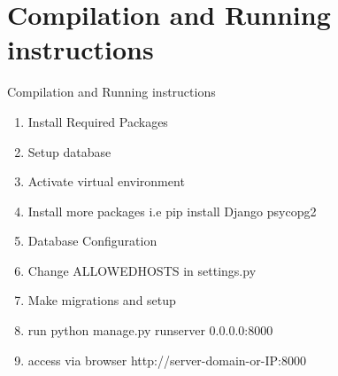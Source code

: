 \documentclass [] {beamer}
\begin{document}


\section{Compilation and Running instructions}
\begin{frame}{Compilation and Running instructions}

\begin{enumerate}
    \item Install Required Packages
    \item Setup database
    \item Activate virtual environment
    \item Install more packages i.e pip install Django psycopg2
    \item Database Configuration
    \item Change ALLOWEDHOSTS in settings.py
    \item Make migrations and setup
    \item run python manage.py runserver 0.0.0.0:8000
    \item access via browser http://server-domain-or-IP:8000
\end{enumerate}


\end{frame}


\begin{frame}
\end{frame}
\end{document}
